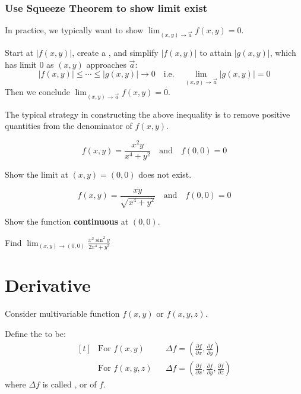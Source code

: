 \documentclass[11pt,fleqn]{book} %
\begin{document}
\subsubsection{Use Squeeze Theorem to show limit exist}

In practice, we typically want to show $\lim_{(x, y) \to \vec{a}} f(x, y) = 0$.

Start at $| f(x, y) |$, create a , and simplify $| f(x, y) |$ to attain $| g(x, y) |$, which has limit $0$ as $(x, y)$ approaches $\vec{a}$: $$|f(x, y)| \le \cdots \le | g(x, y) | \to 0 \quad\text{i.e.}\quad \lim_{(x, y) \to \vec{a}} | g(x, y) | = 0$$ Then we conclude $\lim_{(x, y) \to \vec{a}} f(x, y) = 0$.

The typical strategy in constructing the above inequality is to remove positive quantities from the denominator of $f(x, y)$.

\begin{exercise}
    $$f(x, y) = \frac{x^2y}{x^4 + y^2} \quad\text{and}\quad f(0, 0) = 0$$

    Show the limit at $(x, y) = (0, 0)$ does not exist.
\end{exercise}

\begin{exercise}
    $$f(x, y) = \frac{xy}{\sqrt{x^4 + y^2}} \quad\text{and}\quad f(0, 0) = 0$$

    Show the function \textbf{continuous} at $(0, 0)$.
\end{exercise}

\begin{exercise}
    Find $\lim_{(x, y) \to (0, 0)} \frac{x^2 \sin^2{y}}{2x^4 + y^2}$
\end{exercise}

\section{Derivative}

Consider multivariable function $f(x, y)$ or $f(x, y, z)$.

Define the  to be:
$$\begin{aligned}[t]
    & \text{For } f(x, y)    &  & \Delta f = \left( \frac{\partial f}{\partial x}, \frac{\partial f}{\partial y} \right)                                \\
    & \text{For } f(x, y, z) &  & \Delta f = \left( \frac{\partial f}{\partial x}, \frac{\partial f}{\partial y}, \frac{\partial f}{\partial z} \right)
\end{aligned}$$
where $\Delta f$ is called , or  of $f$.
\end{document}
